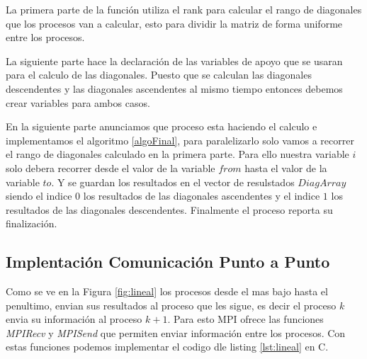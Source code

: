 \documentclass[10pt]{IEEEtran}
\begin{document}
La primera parte de la función utiliza el rank para calcular el rango de diagonales que los procesos van a calcular, esto para dividir la matriz de forma uniforme entre los procesos.

La siguiente parte hace la declaración de las variables de apoyo que se usaran para el calculo de las diagonales. Puesto que se calculan las diagonales descendentes y las diagonales ascendentes al mismo tiempo entonces debemos crear variables para ambos casos.

En la siguiente parte anunciamos que proceso esta haciendo el calculo e implementamos el algoritmo \ref{algoFinal}, para paralelizarlo solo vamos a recorrer el rango de diagonales calculado en la primera parte. Para ello nuestra variable $i$ solo debera recorrer desde el valor de la variable $from$ hasta el valor de la variable $to$. Y se guardan los resultados en el vector de resulstados $DiagArray$ siendo el indice $0$ los resultados de las diagonales ascendentes y el indice $1$ los resultados de las diagonales descendentes. Finalmente el proceso reporta su finalización.

\subsection{Implentación Comunicación Punto a Punto}
Como se ve en la Figura \ref{fig:lineal} los procesos desde el mas bajo hasta el penultimo, envian sus resultados al proceso que les sigue, es decir el proceso $k$ envia su información al proceso $k+1$. Para esto MPI ofrece las funciones \textit{MPI\textunderscore Recv} y \textit{MPI\textunderscore Send} que permiten enviar información entre los procesos. Con estas funciones podemos implementar el codigo dle listing \ref{lst:lineal} en C.
\end{document}
